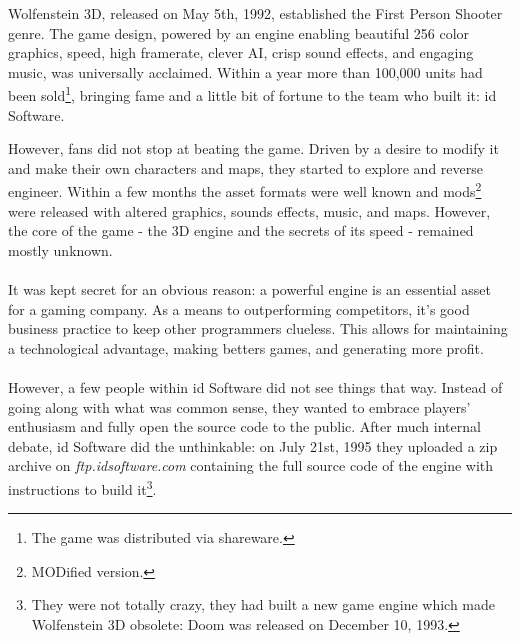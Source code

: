 Wolfenstein 3D, released on May 5th, 1992, established the First Person Shooter genre. The game design, powered by an engine enabling beautiful 256 color graphics, speed, high framerate, clever AI, crisp sound effects, and engaging music, was universally acclaimed. Within a year more than 100,000 units had been sold\footnote{The game was distributed via shareware.}, bringing fame and a little bit of fortune to the team who built it: id Software.\\
\par
\begin{figure}[H]
\centering
{}
\end{figure}
\par
However, fans did not stop at beating the game. Driven by a desire to modify it and make their own characters and maps, they started to explore and reverse engineer. Within a few months the asset formats were well known and  mods\footnote{MODified version.} were released with altered graphics, sounds effects, music, and maps. However, the core of the game - the 3D engine and the secrets of its speed - remained mostly unknown.\\
\\
It was kept secret for an obvious reason: a powerful engine is an essential asset for a gaming company. As a means to outperforming competitors, it's good business practice to keep other programmers clueless. This allows for maintaining a technological advantage, making betters games, and generating more profit.\\
\\
However, a few people within id Software did not see things that way. Instead of going along with what was common sense, they wanted to embrace players' enthusiasm and fully open the source code to the public. After much internal debate, id Software did the unthinkable: on July 21st, 1995 they uploaded a zip archive on \emph{ftp.idsoftware.com} containing the full source code of the engine with instructions to build it\footnote{They were not totally crazy, they had built a new game engine which made Wolfenstein 3D obsolete: Doom was released on December 10, 1993.}.\\


